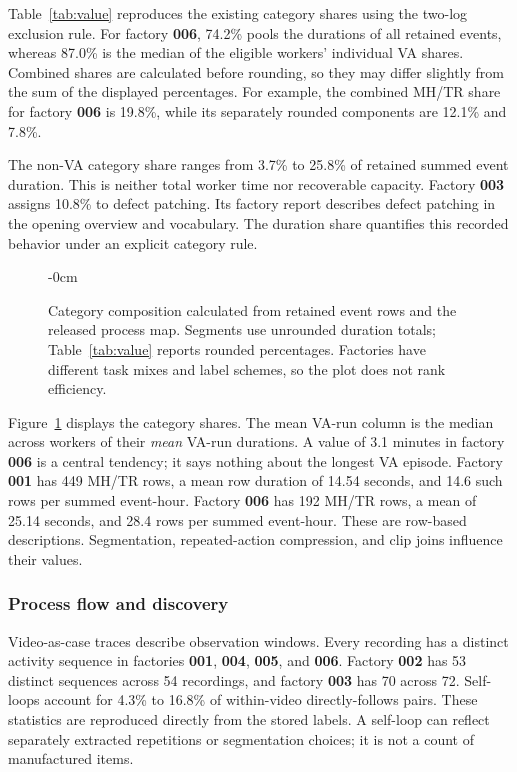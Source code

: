 Table~\ref{tab:value} reproduces the existing category shares using the two-log exclusion rule. For factory \textbf{006}, 74.2\% pools the durations of all retained events, whereas 87.0\% is the median of the eligible workers' individual VA shares. Combined shares are calculated before rounding, so they may differ slightly from the sum of the displayed percentages. For example, the combined MH/TR share for factory \textbf{006} is 19.8\%, while its separately rounded components are 12.1\% and 7.8\%.

The non-VA category share ranges from 3.7\% to 25.8\% of retained summed event duration. This is neither total worker time nor recoverable capacity. Factory \textbf{003} assigns 10.8\% to defect patching. Its factory report describes defect patching in the opening overview and vocabulary. The duration share quantifies this recorded behavior under an explicit category rule.

\begin{figure}[!b]\begin{adjustwidth}{-\extralength}{0cm}\centering

\caption{Category composition calculated from retained event rows and the released process map. Segments use unrounded duration totals; Table~\ref{tab:value} reports rounded percentages. Factories have different task mixes and label schemes, so the plot does not rank efficiency.}
\label{fig:composition}\end{adjustwidth}\end{figure}

Figure~\ref{fig:composition} displays the category shares. The mean VA-run column is the median across workers of their \emph{mean} VA-run durations. A value of 3.1 minutes in factory \textbf{006} is a central tendency; it says nothing about the longest VA episode. Factory \textbf{001} has 449 MH/TR rows, a mean row duration of 14.54 seconds, and 14.6 such rows per summed event-hour. Factory \textbf{006} has 192 MH/TR rows, a mean of 25.14 seconds, and 28.4 rows per summed event-hour. These are row-based descriptions. Segmentation, repeated-action compression, and clip joins influence their values.

\subsubsection{Process flow and discovery}
\label{sec:discovery}
Video-as-case traces describe observation windows. Every recording has a distinct activity sequence in factories \textbf{001}, \textbf{004}, \textbf{005}, and \textbf{006}. Factory \textbf{002} has 53 distinct sequences across 54 recordings, and factory \textbf{003} has 70 across 72. Self-loops account for 4.3\% to 16.8\% of within-video directly-follows pairs. These statistics are reproduced directly from the stored labels. A self-loop can reflect separately extracted repetitions or segmentation choices; it is not a count of manufactured items.

